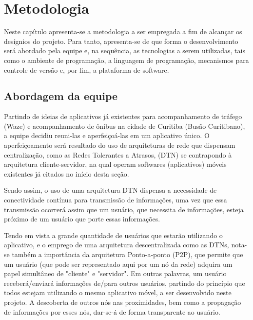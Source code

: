 \chapter{Metodologia}\label{cap:metodologia}

Neste capítulo apresenta-se a metodologia a ser empregada a fim de alcançar os desígnios do projeto. Para tanto, apresenta-se de que forma o desenvolvimento será abordado pela equipe e, na sequência, as tecnologias a serem utilizadas, tais como o ambiente de programação, a linguagem de programação, mecanismos para controle de versão e, por fim, a plataforma de software. 

\section{Abordagem da equipe}\label{s:fundamentos}

Partindo de ideias de aplicativos já existentes para acompanhamento de tráfego (Waze) e acompanhamento de ônibus na cidade de Curitiba (Busão Curitibano), a equipe decidiu reuni-las e aperfeiçoá-las em um aplicativo único. O aperfeiçoamento será resultado do uso de arquiteturas de rede que dispensam centralização, como as Redes Tolerantes a Atrasos, (DTN) se contrapondo à arquitetura cliente-servidor, na qual operam softwares (aplicativos) móveis existentes já citados no início desta seção. 

Sendo assim, o uso de uma arquitetura DTN dispensa a necessidade de conectividade contínua para transmissão de informações, uma vez que essa transmissão ocorrerá assim que um usuário, que necessita de informações, esteja próximo de um usuário que porte essas informações. 

Tendo em vista a grande quantidade de usuários que estarão utilizando o aplicativo, e o emprego de uma arquitetura descentralizada como as DTNs, nota-se também a importância da arquitetura Ponto-a-ponto (P2P), que permite que um usuário (que pode ser representado aqui por um nó da rede) adquira um papel simultâneo de "cliente" e "servidor". Em outras palavras, um usuário receberá/enviará informações de/para outros usuários, partindo do princípio que todos estejam utilizando o mesmo aplicativo móvel, a ser desenvolvido neste projeto. A descoberta de outros nós nas proximidades, bem como a propagação de informações por esses nós, dar-se-á de forma transparente ao usuário.


